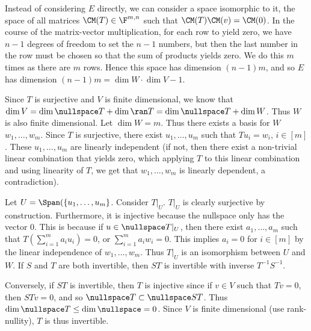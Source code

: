 \documentclass{book}
\begin{document}
\begin{enumerate}[label=\arabic*)]
\begin{enumerate}[label=\alph*)]
        Instead of considering $E$ directly, we can consider a space isomorphic to it, the space of all matrices $\CM(T) \in \F^{m, n}$ such that $\CM(T)\CM(v) = \CM(0)$. In the course of
        the matrix-vector multiplication, for each row to yield zero, we have $n - 1$ degrees of freedom to set the $n - 1$ numbers, but then the last number in the row must be chosen so
        that the sum of products yields zero. We do this $m$ times as there are $m$ rows.  Hence this space has dimension $(n - 1)m$, and so $E$ has dimension $(n - 1)m = \dim W\cdot\dim V -
        1$.
      \end{enumerate}
    \ii
      Since $T$ is surjective and $V$ is finite dimensional, we know that $\dim V = \dim\nullspace T + \dim\ran T = \dim\nullspace T + \dim W$. Thus $W$ is also finite dimensional. Let $\dim
      W = m$. Thus there exists a basis for $W$ $w_1, \dots, w_m$. 
      Since $T$ is surjective, there exist $u_1, \dots, u_m$ such that $Tu_i = w_i$, $i \in [m]$. These $u_1, \dots, u_m$ are linearly independent (if not, then there exist a non-trivial
      linear combination that yields zero, which applying $T$ to this linear combination and using linearity of $T$, we get that $w_1, \dots, w_m$ is linearly dependent, a contradiction).
      
      Let $U = \Span(\{u_1, \dots, u_m\}$. Consider $T|_U$. $T|_U$ is clearly surjective by construction. Furthermore, it is injective because the nullspace only has the vector $0$. This is
      because if $u \in \nullspace T|_U$, then there exist $a_1, \dots, a_m$ such that $T(\sum_{i = 1}^{m}a_iu_i) = 0$, or $\sum_{i = 1}^{m}a_iw_i = 0$. This implies $a_i = 0$ for $i \in
      [m]$ by the linear independence of $w_1, \dots, w_m$. Thus $T|_U$ is an isomorphism between $U$ and $W$.
    \ii
      If $S$ and $T$ are both invertible, then $ST$ is invertible with inverse $T^{-1}S^{-1}$. 

      Conversely, if $ST$ is invertible, then $T$ is injective since if $v \in V$ such that $Tv = 0$, then $STv = 0$, and so $\nullspace T \subset \nullspace ST$. Thus $\dim\nullspace T \leq
      \dim\nullspace = 0$. Since $V$ is finite dimensional (use rank-nullity), $T$ is thus invertible. 


\end{enumerate}
\end{document}

